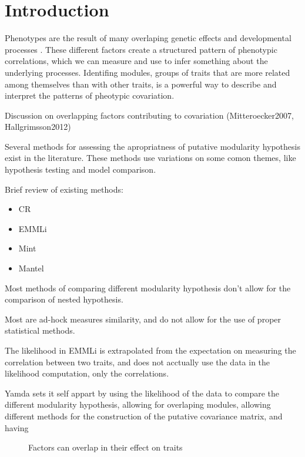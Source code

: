 \section*{Introduction}

Phenotypes are the result of many overlaping genetic effects and developmental
processes \citep{Lande1983-ez,Klingenberg2008-ll,Melo2016-yw}. These different
factors create a structured pattern of phenotypic correlations, which we can
measure and use to infer something about the underlying processes. Identifing
modules, groups of traits that are more related among themselves than with other
traits, is a powerful way to describe and interpret the patterns of pheotypic
covariation.

Discussion on overlapping factors contributing to covariation (Mitteroecker2007,
Hallgrimsson2012)

Several methods for assessing the apropriatness of putative modularity
hypothesis exist in the literature. These methods use variations on some comon
themes, like hypothesis testing and model comparison.

Brief review of existing methods:

\begin{itemize}
    \item CR    
    \item EMMLi
    \item Mint
    \item Mantel
\end{itemize}

Most methods of comparing different modularity hypothesis don't allow for the
comparison of nested hypothesis. 

Most are ad-hock measures similarity, and do
not allow for the use of proper statistical methods. 

The likelihood in EMMLi is
extrapolated from the expectation on measuring the correlation between two
traits, and does not acctually use the data in the likelihood computation, only
the correlations. 

Yamda sets it self appart by using the likelihood of the data to compare the
different modularity hypothesis, allowing for overlaping modules, allowing
different methods for the construction of the putative covariance matrix, and
having 


\begin{figure}[h]
    \center
    
\caption[Factors and modules]{ Factors can overlap in their effect on traits }
\label{fig:factor-diagram}
\end{figure} 

